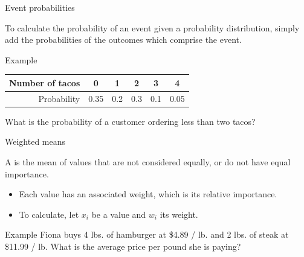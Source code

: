 \documentclass[xcolor=table, aspectratio=169, bigger, handout]{beamer}
\begin{document}
\begin{frame}{Event probabilities}
\begin{block}{}
To calculate the probability of an event given a probability distribution, simply add the probabilities of the outcomes which comprise the event.
\end{block}
\pause
\begin{exampleblock}{Example}
{\centering \tabspacemed
\begin{tabular}{r | c cccc}
Number of tacos & 0 & 1 & 2 & 3 & 4\\
\hline
Probability &  0.35 & 0.2 & 0.3 & 0.1 & 0.05
\end{tabular}\par
}
\bigskip
What is the probability of a customer ordering less than two tacos?\\ \smallskip
\pause
{}
\end{exampleblock}
\end{frame}

\begin{frame}{Weighted means}
\begin{block}{}
A  is the mean of values that are not considered equally, or do not have equal importance.
\begin{itemize}
\item Each value has an associated weight, which is its relative importance.
\item To calculate, let $x_i$ be a value and $w_i$ its weight. \\ \smallskip
{}
\end{itemize}
\end{block}
\pause
\begin{exampleblock}{Example}
Fiona buys 4 lbs. of hamburger at \$4.89 / lb. and 2 lbs. of steak at \$11.99 / lb. What is the average price per pound she is paying?\\ \smallskip 
\pause
{}
\end{exampleblock}
\end{frame}
\end{document}
